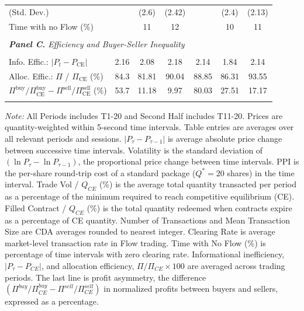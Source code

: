 \documentclass[12pt]{article}
\begin{document}
\begin{table}[!h]
{\begin{threeparttable}
\begin{tabular}{lcccccc}
     \hspace{3mm}(Std. Dev.)             &           & (2.6)    & (2.42)     &           & (2.4)     & (2.13)   \\
      Time with no Flow (\%)               &           & 11      & 12    &           & 10        & 11   \\

     \\ [-1.8ex]
     \multicolumn{7}{l}{\textit{\textbf{Panel C.} Efficiency and Buyer-Seller Inequality}} \\
     \\ [-1.8ex]
     
     Info. Effic.: $\lvert P_t - P_{\text{CE}} \rvert $        & 2.16      & 2.08    & 2.18  & 2.14      & 1.84    & 2.14  \\     
     Alloc. Effic.: $\Pi$ / $\Pi_{\text{CE}}$ (\%)   & 84.3      & 81.81    & 90.04     & 88.85     & 86.31     & 93.55   \\
     
     ${\Pi^{\text{buy}}}/{\Pi^{\text{buy}}_{\text{CE}}} - {\Pi^{\text{sell}}}/{\Pi^{\text{sell}}_{\text{CE}}}$ 
     (\%) & 53.7      & 11.18    & 9.97    & 80.03     & 27.51    & 17.17    \\
     \\[-1.8ex] 
    \bottomrule
    \end{tabular}
    \begin{tablenotes}
\footnotesize
\textit{Note:} 
All Periods includes T1-20 and Second Half includes T11-20.
Prices are quantity-weighted within 5-second time intervals.
Table entries are averages over all relevant periods and sessions. 
$|P_{\tau} - P_{\tau-1}|$ is average absolute price change between successive time intervals. 
Volatility is the standard deviation of $\left( \ln P_{\tau} - \ln P_{\tau-1} \right)$, the proportional price change between time intervals. 
PPI is the per-share round-trip cost of a standard package ($Q^* = 20$ shares) in the time interval.
Trade Vol / $Q_{CE}$ (\%) is the average total quantity transacted per period as a percentage of the minimum required to reach competitive equilibrium (CE). 
Filled Contract / $Q_{CE}$ (\%) is the total quantity redeemed when contracts expire as a percentage of CE quantity.
Number of Transactions and Mean Transaction Size are CDA averages rounded to nearest integer. 
Clearing Rate is average market-level transaction rate in Flow trading. 
    Time with No Flow (\%) is percentage of time intervals with zero clearing rate. 
    Informational inefficiency, $|P_{\tau} - P_{CE}|$, and allocation efficiency, $ \Pi/\Pi_{CE} \times 100$ are averaged across trading periods.
    The last line is profit asymmetry, the difference $(\Pi^{buy}/\Pi^{buy}_{CE} - \Pi^{sell}/\Pi^{sell}_{CE})$ in normalized profits between buyers and sellers, expressed as a percentage. 
    \end{tablenotes} 
\end{threeparttable}

   }
\end{table}
\end{document}
